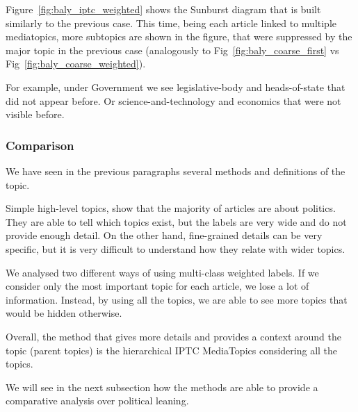 Figure~\ref{fig:baly_iptc_weighted} shows the Sunburst diagram that is built similarly to the previous case. This time, being each article linked to multiple mediatopics, more subtopics are shown in the figure, that were suppressed by the major topic in the previous case (analogously to Fig~\ref{fig:baly_coarse_first} vs Fig~\ref{fig:baly_coarse_weighted}).

For example, under Government we see legislative-body and heads-of-state that did not appear before. Or science-and-technology and economics that were not visible before.




\subsubsection{\statusgreen Comparison}

We have seen in the previous paragraphs several methods and definitions of the topic.

Simple high-level topics, show that the majority of articles are about politics. They are able to tell which topics exist, but the labels are very wide and do not provide enough detail.
On the other hand, fine-grained details can be very specific, but it is very difficult to understand how they relate with wider topics.

We analysed two different ways of using multi-class weighted labels. If we consider only the most important topic for each article, we lose a lot of information. Instead, by using all the topics, we are able to see more topics that would be hidden otherwise.

Overall, the method that gives more details and provides a context around the topic (parent topics) is the hierarchical IPTC MediaTopics considering all the topics.

We will see in the next subsection how the methods are able to provide a comparative analysis over political leaning.



